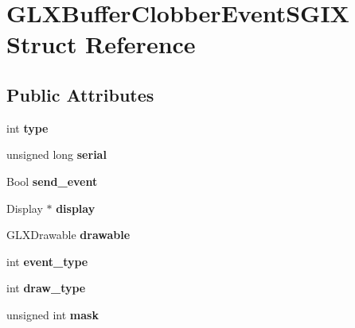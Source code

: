 \hypertarget{structGLXBufferClobberEventSGIX}{}\section{G\+L\+X\+Buffer\+Clobber\+Event\+S\+G\+IX Struct Reference}
\label{structGLXBufferClobberEventSGIX}
\subsection*{Public Attributes}
\begin{DoxyCompactItemize}
\item 
\mbox{\label{structGLXBufferClobberEventSGIX_a36e3e8a5feea664623ea43d0f273b63a}} 
int {\bfseries type}
\item 
\mbox{\label{structGLXBufferClobberEventSGIX_ac295e3276a7986eeae4d6a2a28c7e0b7}} 
unsigned long {\bfseries serial}
\item 
\mbox{\label{structGLXBufferClobberEventSGIX_af43bf0edbe40a74ef58dfb546a75118b}} 
Bool {\bfseries send\+\_\+event}
\item 
\mbox{\label{structGLXBufferClobberEventSGIX_afef060d81026da75c846727f4a3de9d4}} 
Display $\ast$ {\bfseries display}
\item 
\mbox{\label{structGLXBufferClobberEventSGIX_a9c45674193ed80a79261c3b7518ee04f}} 
G\+L\+X\+Drawable {\bfseries drawable}
\item 
\mbox{\label{structGLXBufferClobberEventSGIX_a0b405123f1d6528f1f4dfa7ff92bde9b}} 
int {\bfseries event\+\_\+type}
\item 
\mbox{\label{structGLXBufferClobberEventSGIX_a25c31e8cbec0919f74a1e93ae74175b1}} 
int {\bfseries draw\+\_\+type}
\item 
\mbox{\label{structGLXBufferClobberEventSGIX_a74b4ad1ad3cac011001151411f621da1}} 
unsigned int {\bfseries mask}
\item 

\end{DoxyCompactItemize}
